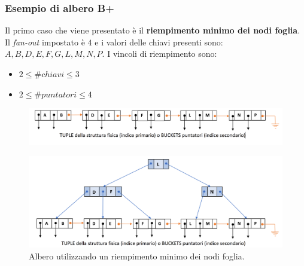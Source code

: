 \documentclass[a4paper]{article}
\begin{document}
	\subsubsection{Esempio di albero B+}\label{esempio di albero B+}
	
	Il primo caso che viene presentato è il \textcolor{Green4}{\textbf{riempimento minimo dei nodi foglia}}. Il \emph{fan-out} impostato è $4$ e i valori delle chiavi presenti sono: $A,B,D,E,F,G,L,M,N,P$. I vincoli di riempimento sono:
	\begin{itemize}
		\item $2 \le \#chiavi \le 3$
		\item $2 \le \#puntatori \le 4$
	\end{itemize}
	\begin{figure}[!htp]
		\centering
		\includegraphics[width=\textwidth]{img/esempio_riempimento_minimo.png}
	\end{figure}
	\begin{figure}[!htp]
		\centering
		\includegraphics[width=\textwidth]{img/esempio_riempimento_minimo-albero.png}
		\caption{Albero utilizzando un riempimento minimo dei nodi foglia.}
	\end{figure}
	
\end{document}
